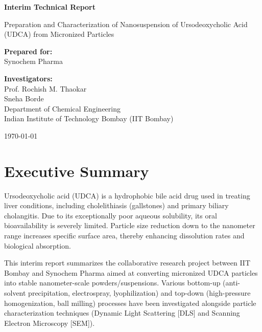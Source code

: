 \documentclass[11pt,a4paper]{article}
\begin{document}
\begin{titlepage}
    \centering
    \vspace*{1cm}
    {\Huge \bfseries Interim Technical Report \par}
    \vspace{0.5cm}
    {\Large \color{secondary} Preparation and Characterization of Nanosuspension of Ursodeoxycholic Acid (UDCA) from Micronized Particles \par}
    \vspace{1.5cm}
    
    \textbf{Prepared for:}\\
    \Large Synochem Pharma\\
    \vspace{1cm}
    
    \textbf{Investigators:}\\
    \Large Prof. Rochish M. Thaokar\\
    Sneha Borde\\
    \vspace{0.5cm}
    \small Department of Chemical Engineering\\
    Indian Institute of Technology Bombay (IIT Bombay)\\
    
    \vfill
    
    {\large \today \par}
\end{titlepage}

\newpage

\section{Executive Summary}
Ursodeoxycholic acid (UDCA) is a hydrophobic bile acid drug used in treating liver conditions, including cholelithiasis (gallstones) and primary biliary cholangitis. Due to its exceptionally poor aqueous solubility, its oral bioavailability is severely limited. Particle size reduction down to the nanometer range increases specific surface area, thereby enhancing dissolution rates and biological absorption. 

This interim report summarizes the collaborative research project between IIT Bombay and Synochem Pharma aimed at converting micronized UDCA particles into stable nanometer-scale powders/suspensions. Various bottom-up (anti-solvent precipitation, electrospray, lyophilization) and top-down (high-pressure homogenization, ball milling) processes have been investigated alongside particle characterization techniques (Dynamic Light Scattering [DLS] and Scanning Electron Microscopy [SEM]).
\end{document}
